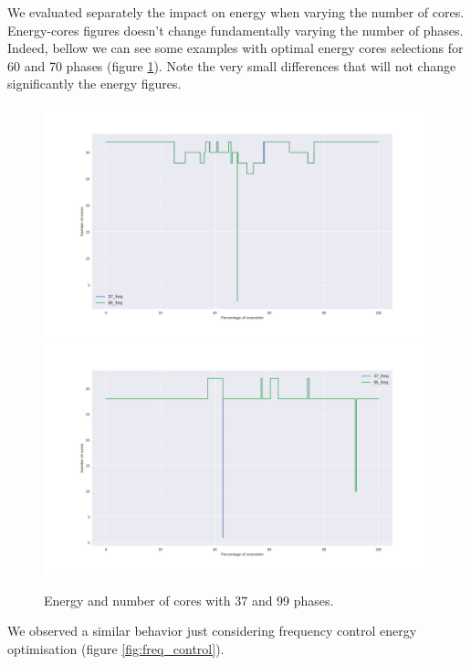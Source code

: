 We evaluated separately the impact on energy when varying the number of cores. Energy-cores figures doesn't change fundamentally varying the number of phases. Indeed, bellow we can see some examples with optimal energy cores selections for 60 and 70 phases (figure \ref{fig:cores_control}). Note the very small differences that will not change significantly the energy figures.

\begin{figure}[h!]
\includegraphics[width=\columnwidth]{phases/figures/signals/completo_black_3_cores_signals_cmp.png}
\includegraphics[width=\columnwidth]{phases/figures/signals/completo_bodytrack_3_cores_signals_cmp.png}
\caption{Energy and number of cores with 37 and 99 phases.}
    \label{fig:cores_control}
\end{figure}

We observed a similar behavior just considering frequency control energy optimisation (figure \ref{fig:freq_control}).

